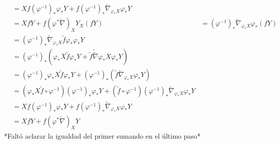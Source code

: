 \documentclass[11pt]{article}
\begin{document}
\begin{enumerate}
\begin{align*}
     &=Xf(\varphi^{-1})_*\varphi_*Y+f(\varphi^{-1})_*\widetilde{\nabla}_{\varphi_*X}\varphi_*Y\\
     &=XfY+f(\varphi^*\widetilde{\nabla})_{X}Y_{X}(fY)&=(\varphi^{-1})_*\widetilde{\nabla}_{\varphi_*X}\varphi_*(fY)\\
     &=(\varphi^{-1})_*\widetilde{\nabla}_{\varphi_*X}\tilde{f}\varphi_*\varphi_*Y\\
     &=(\varphi^{-1})_*\left( \varphi_*X\tilde{f}\varphi_*Y+\tilde{f}\widetilde{\widetilde{\nabla}}{\varphi_*X}\varphi_*Y\right)\\
     &=(\varphi^{-1})_*\varphi_*X\tilde{f}\varphi_*Y+(\varphi^{-1})_*(\tilde{f}\widetilde{\nabla}_{\varphi_*X}\varphi_*Y)\\
     &=(\varphi_*X\tilde{f}\circ\varphi^{-1})(\varphi^{-1})_*\varphi_*Y+(\tilde{f}\circ\varphi^{-1})(\varphi^{-1})_*\widetilde{\nabla}_{\varphi_*X}\varphi_*Y\\
     &=Xf(\varphi^{-1})_*\varphi_*Y+f(\varphi^{-1})_*\widetilde{\nabla}_{\varphi_*X}\varphi_*Y\\
     &=XfY+f(\varphi^*\widetilde{\nabla})_{X}Y
    \end{align*}
*Faltó aclarar la igualdad del primer sumando en el último paso*
\end{enumerate}
\newpage
\end{document}
